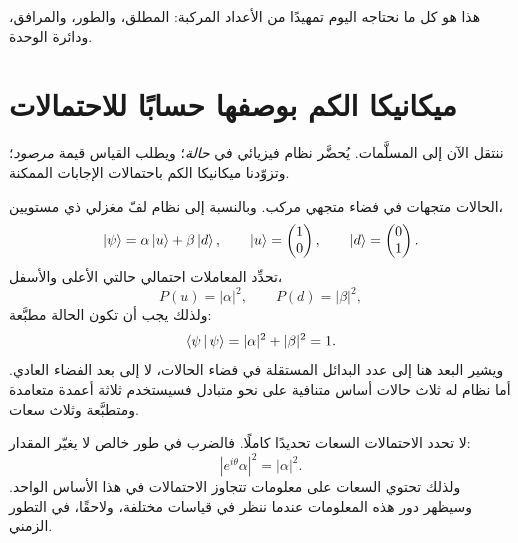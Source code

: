 \begin{classroomqa}
\end{classroomqa}

هذا هو كل ما نحتاجه اليوم تمهيدًا من الأعداد المركبة: المطلق، والطور، والمرافق، ودائرة الوحدة.

\section{ميكانيكا الكم بوصفها حسابًا للاحتمالات}

ننتقل الآن إلى المسلَّمات. يُحضَّر نظام فيزيائي في \emph{حالة}؛ ويطلب القياس قيمة \emph{مرصود}؛ وتزوّدنا ميكانيكا الكم باحتمالات الإجابات الممكنة.

الحالات متجهات في فضاء متجهي مركب. وبالنسبة إلى نظام لفّ مغزلي ذي مستويين،
\begin{equation}
  \left\lvert\psi\right\rangle=\alpha\left\lvert u\right\rangle+\beta\left\lvert d\right\rangle,
  \qquad
  \left\lvert u\right\rangle=\begin{pmatrix}1\\0\end{pmatrix},
  \qquad
  \left\lvert d\right\rangle=\begin{pmatrix}0\\1\end{pmatrix}.
  \label{eq:l03-two-level-state}
\end{equation}
تحدِّد المعاملات احتمالي حالتي الأعلى والأسفل،
\begin{equation}
  P(u)=|\alpha|^2,
  \qquad
  P(d)=|\beta|^2,
\end{equation}
ولذلك يجب أن تكون الحالة مطبَّعة:
\begin{equation}
  \left\langle\psi\,\middle|\,\psi\right\rangle
  =|\alpha|^2+|\beta|^2
  =1.
  \label{eq:l03-state-normalization}
\end{equation}
ويشير البعد هنا إلى عدد البدائل المستقلة في فضاء الحالات، لا إلى بعد الفضاء العادي. أما نظام له ثلاث حالات أساس متنافية على نحو متبادل فسيستخدم ثلاثة أعمدة متعامدة ومتطبَّعة وثلاث سعات.

لا تحدد الاحتمالات السعات تحديدًا كاملًا. فالضرب في طور خالص لا يغيّر المقدار:
\begin{equation}
  |e^{i\theta}\alpha|^2=|\alpha|^2.
\end{equation}
ولذلك تحتوي السعات على معلومات تتجاوز الاحتمالات في هذا الأساس الواحد. وسيظهر دور هذه المعلومات عندما ننظر في قياسات مختلفة، ولاحقًا، في التطور الزمني.


